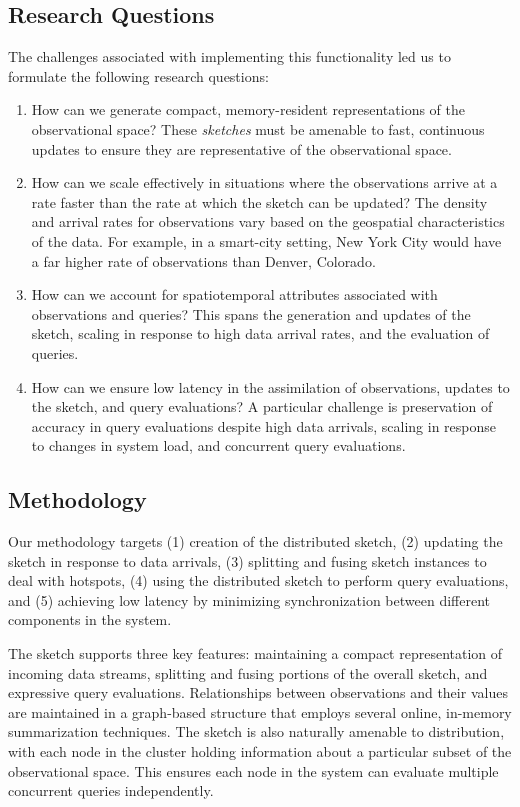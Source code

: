 \subsection{Research Questions}
The challenges associated with implementing this functionality led us to formulate the following research questions:
\begin{enumerate}
    \item   How can we generate compact, memory-resident representations of the observational space? These \emph{sketches} must be amenable to fast, continuous updates to ensure they are representative of the observational space.
    \item   How can we scale effectively in situations where the observations arrive at a rate faster than the rate at which the sketch can be updated? The density and arrival rates for observations vary based on the geospatial characteristics of the data. For example, in a smart-city setting, New York City would have a far higher rate of observations than Denver, Colorado.
    \item   How can we account for spatiotemporal attributes associated with observations and queries? This spans the generation and updates of the sketch, scaling in response to high data arrival rates, and the evaluation of queries.
    \item   How can we ensure low latency in the assimilation of observations, updates to the sketch, and query evaluations? A particular challenge is preservation of accuracy in query evaluations despite high data arrivals, scaling in response to changes in system load, and concurrent query evaluations.
\end{enumerate}

\subsection{Methodology}
Our methodology targets (1) creation of the distributed sketch, (2) updating the sketch in response to data arrivals, (3) splitting and fusing sketch instances to deal with hotspots, (4) using the distributed sketch to perform query evaluations, and (5) achieving low latency by minimizing synchronization between different components in the system. 

The sketch supports three key features: maintaining a compact representation of incoming data streams, splitting and fusing portions of the overall sketch, and expressive query evaluations. Relationships between observations and their values are maintained in a graph-based structure that employs several online, in-memory summarization techniques. The sketch is also naturally amenable to distribution, with each node in the cluster holding information about a particular subset of the observational space.  This ensures each node in the system can evaluate multiple concurrent queries independently.

